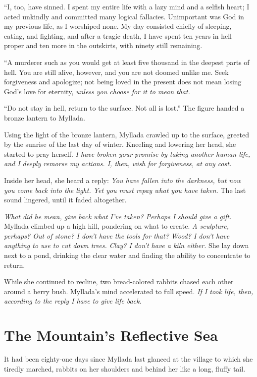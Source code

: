 ``I, too, have sinned. I spent my entire life with a lazy mind and a selfish heart; I acted unkindly and committed many logical fallacies. Unimportant was God in my previous life, as I worshiped none. My day consisted chiefly of sleeping, eating, and fighting, and after a tragic death, I have spent ten years in hell proper and ten more in the outskirts, with ninety still remaining.

``A murderer such as you would get at least five thousand in the deepest parts of hell. You are still alive, however, and you are not doomed unlike me. Seek forgiveness and apologize; not being loved in the present does not mean losing God's love for eternity, \emph{unless you choose for it to mean that.}

``Do not stay in hell, return to the surface. Not all is lost.'' The figure handed a bronze lantern to Myllada.

\centeredstars

Using the light of the bronze lantern, Myllada crawled up to the surface, greeted by the sunrise of the last day of winter. Kneeling and lowering her head, she started to pray herself. \emph{I have broken your promise by taking another human life, and I deeply remorse my actions. I, then, wish for forgiveness, at any cost.}

Inside her head, she heard a reply: \emph{You have fallen into the darkness, but now you come back into the light. Yet you must repay what you have taken.} The last sound lingered, until it faded altogether.

\emph{What did he mean, give back what I've taken? Perhaps I should give a gift.} Myllada climbed up a high hill, pondering on what to create. \emph{A sculpture, perhaps? Out of stone? I don't have the tools for that? Wood? I don't have anything to use to cut down trees. Clay? I don't have a kiln either.} She lay down next to a pond, drinking the clear water and finding the ability to concentrate to return.

While she continued to recline, two bread-colored rabbits chased each other around a berry bush. Myllada's mind accelerated to full speed. \emph{If I took life, then, according to the reply I have to give life back.}

\chapter{The Mountain's Reflective Sea}

It had been eighty-one days since Myllada last glanced at the village to which she tiredly marched, rabbits on her shoulders and behind her like a long, fluffy tail.

